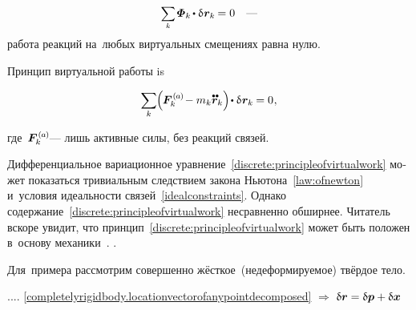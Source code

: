 \begin{otherlanguage}{russian}
\nopagebreak\begin{equation}\label{idealconstraints}
\scalebox{0.9}{$\displaystyle \sum_{\smash{k}}$} \hspace{.2ex} \mathboldPhi_k \hspace{-0.2ex} \dotp \variation{\hspace{.1ex}\locationvector_k} \hspace{-0.16ex} = 0
\quad \textrm{---}
\vspace{-0.25em}\end{equation}
\noindent
работа реакций на~любых виртуальных смещениях равна нулю.

Принцип виртуальной работы is

\nopagebreak\vspace{-0.1em}\begin{equation}\label{discrete:principleofvirtualwork}
\displaystyle \sum_{\smash{k}} \hspace{-0.1ex} \Bigl( \hspace{-0.1ex} \bm{F}_{k}^{\smthactive} \hspace{-0.2ex} - m_k \mathdotdotabove{\locationvector}_k \Bigr) \hspace{-0.3ex} \dotp \variation{\hspace{.1ex}\locationvector_k} \hspace{-0.1ex} = 0
\hspace{.1ex} ,
\vspace{-0.3em}
\end{equation}

\noindent
где~${\bm{F}_{k}^{\smthactive}}$\:--- лишь активные силы, без реакций связей.

Дифференциальное вариационное уравнение~\eqref{discrete:principleofvirtualwork} может показаться тривиальным следствием закона Ньютона~\eqref{law:ofnewton} и~условия идеальности связей~\eqref{idealconstraints}.
Однако содержание~\eqref{discrete:principleofvirtualwork} несравненно обширнее.
Читатель вскоре увидит, что принцип~\eqref{discrete:principleofvirtualwork} может быть положен в~основу механики~\cite{gantmacher-analyticalmechanics}.
\ru{,}
\ru{,}
.

Для~примера рассмотрим совершенно жёсткое~(недеформируемое) твёрдое тело.

.... \eqref{completelyrigidbody.locationvectorofanypointdecomposed} ${\Rightarrow}$
${\updelta\hspace{-0.1ex}\bm{r} = \updelta\hspace{-0.1ex}\bm{p} + \updelta\hspace{-0.1ex}\bm{x}}$


\end{otherlanguage}
